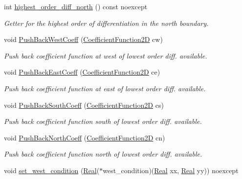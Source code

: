 \begin{DoxyCompactItemize}
int \hyperlink{classmtk_1_1BCDescriptor2D_a87c5f2449247d65ea07784ba2ec61bc7}{highest\+\_\+order\+\_\+diff\+\_\+north} () const noexcept
\begin{DoxyCompactList}\small\item\em Getter for the highest order of differentiation in the north boundary. \end{DoxyCompactList}\item 
void \hyperlink{classmtk_1_1BCDescriptor2D_a3da32ba89cfb15032bb1156394bad98c}{Push\+Back\+West\+Coeff} (\hyperlink{group__c07-mim__ops_gad9e1c0ace886b0029aefffa5f320e852}{Coefficient\+Function2\+D} cw)
\begin{DoxyCompactList}\small\item\em Push back coefficient function at west of lowest order diff. available. \end{DoxyCompactList}\item 
void \hyperlink{classmtk_1_1BCDescriptor2D_a27635428a6c36d1e305cafdc68271063}{Push\+Back\+East\+Coeff} (\hyperlink{group__c07-mim__ops_gad9e1c0ace886b0029aefffa5f320e852}{Coefficient\+Function2\+D} ce)
\begin{DoxyCompactList}\small\item\em Push back coefficient function at east of lowest order diff. available. \end{DoxyCompactList}\item 
void \hyperlink{classmtk_1_1BCDescriptor2D_a9eb891f14c68968a0113632fa5fea630}{Push\+Back\+South\+Coeff} (\hyperlink{group__c07-mim__ops_gad9e1c0ace886b0029aefffa5f320e852}{Coefficient\+Function2\+D} cs)
\begin{DoxyCompactList}\small\item\em Push back coefficient function south of lowest order diff. available. \end{DoxyCompactList}\item 
void \hyperlink{classmtk_1_1BCDescriptor2D_a0fed58bd058d699a572888fe4b9934a4}{Push\+Back\+North\+Coeff} (\hyperlink{group__c07-mim__ops_gad9e1c0ace886b0029aefffa5f320e852}{Coefficient\+Function2\+D} cn)
\begin{DoxyCompactList}\small\item\em Push back coefficient function north of lowest order diff. available. \end{DoxyCompactList}\item 
void \hyperlink{classmtk_1_1BCDescriptor2D_a006050efe15b1be75b36a74a23051392}{set\+\_\+west\+\_\+condition} (\hyperlink{group__c01-roots_gac080bbbf5cbb5502c9f00405f894857d}{Real}($\ast$west\+\_\+condition)(\hyperlink{group__c01-roots_gac080bbbf5cbb5502c9f00405f894857d}{Real} xx, \hyperlink{group__c01-roots_gac080bbbf5cbb5502c9f00405f894857d}{Real} yy)) noexcept

\end{DoxyCompactItemize}
